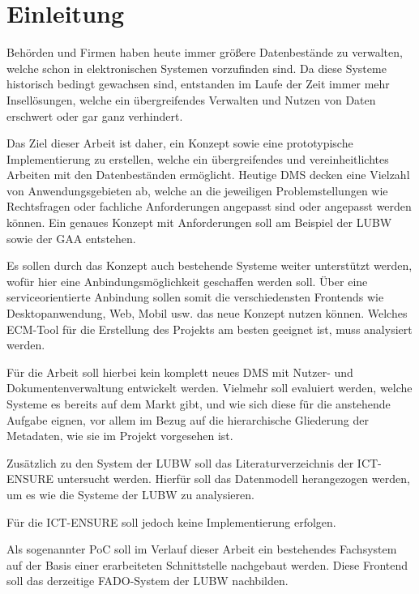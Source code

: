 \section{Einleitung} \label{Einfuehrung}
Beh\"orden und Firmen haben heute immer gr\"o\ss{}ere Datenbest\"ande zu verwalten, welche schon in elektronischen Systemen vorzufinden sind. Da diese Systeme historisch bedingt gewachsen sind, entstanden im Laufe der Zeit immer mehr Insell\"osungen, welche ein \"ubergreifendes Verwalten und Nutzen von Daten erschwert oder gar ganz verhindert.

Das Ziel dieser Arbeit ist daher, ein Konzept sowie eine prototypische Implementierung zu erstellen, welche ein \"ubergreifendes und vereinheitlichtes Arbeiten mit den Datenbest\"anden erm\"oglicht. Heutige \ac{DMS} decken eine Vielzahl von Anwendungsgebieten ab, welche an die jeweiligen Problemstellungen wie Rechtsfragen oder fachliche Anforderungen angepasst sind oder angepasst werden k\"onnen.
Ein genaues Konzept mit Anforderungen soll am Beispiel der \ac{LUBW} sowie der \ac{GAA} entstehen.
\cite{Dokumenten-Management}

Es sollen durch das Konzept auch bestehende Systeme weiter unterst\"utzt werden, wof\"ur hier eine Anbindungsm\"oglichkeit geschaffen werden soll. \"Uber eine serviceorientierte Anbindung sollen somit die verschiedensten Frontends wie Desktopanwendung, Web, Mobil usw. das neue Konzept nutzen k\"onnen. Welches \ac{ECM}-Tool f\"ur die Erstellung des Projekts am besten geeignet ist, muss analysiert werden.

F\"ur die Arbeit soll hierbei kein komplett neues \ac{DMS} mit Nutzer- und Dokumentenverwaltung entwickelt werden. Vielmehr soll evaluiert werden, welche Systeme es bereits auf dem Markt gibt, und wie sich diese f\"ur die anstehende Aufgabe eignen, vor allem im Bezug auf die hierarchische Gliederung der Metadaten, wie sie im Projekt vorgesehen ist. 

Zus\"atzlich zu den System der \ac{LUBW} soll das Literaturverzeichnis der \ac{ICT-ENSURE} untersucht werden. Hierf\"ur soll das Datenmodell herangezogen werden, um es wie die Systeme der \ac{LUBW} zu analysieren. 

F\"ur die \ac{ICT-ENSURE} soll jedoch keine Implementierung erfolgen.

Als sogenannter \ac{PoC} soll im Verlauf dieser Arbeit ein bestehendes Fachsystem auf der Basis einer erarbeiteten Schnittstelle nachgebaut werden. Diese Frontend soll das derzeitige \ac{FADO}-System der \ac{LUBW} nachbilden.